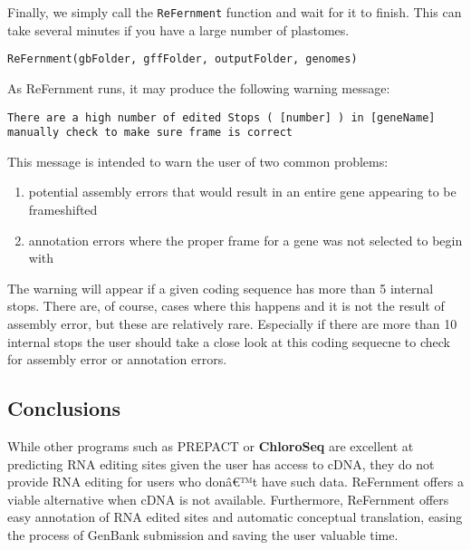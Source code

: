 \documentclass[]{article}
\providecommand{\tightlist}{%
  \setlength{\itemsep}{0pt}\setlength{\parskip}{0pt}}
\begin{document}
Finally, we simply call the \texttt{ReFernment} function and wait for it
to finish. This can take several minutes if you have a large number of
plastomes.

\begin{verbatim}
ReFernment(gbFolder, gffFolder, outputFolder, genomes)
\end{verbatim}

As ReFernment runs, it may produce the following warning message:

\begin{verbatim}
There are a high number of edited Stops ( [number] ) in [geneName] manually check to make sure frame is correct
\end{verbatim}

This message is intended to warn the user of two common problems:

\begin{enumerate}
\tightlist
\item
  potential assembly errors that would result in an entire gene
  appearing to be frameshifted
\item
  annotation errors where the proper frame for a gene was not selected
  to begin with
\end{enumerate}

The warning will appear if a given coding sequence has more than 5
internal stops. There are, of course, cases where this happens and it is
not the result of assembly error, but these are relatively rare.
Especially if there are more than 10 internal stops the user should take
a close look at this coding sequecne to check for assembly error or
annotation errors.

\hypertarget{conclusions}{%
\subsection{Conclusions}\label{conclusions}}

While other programs such as PREPACT or \textbf{ChloroSeq} are excellent
at predicting RNA editing sites given the user has access to cDNA, they
do not provide RNA editing for users who donâ€™t have such data.
ReFernment offers a viable alternative when cDNA is not available.
Furthermore, ReFernment offers easy annotation of RNA edited sites and
automatic conceptual translation, easing the process of GenBank
submission and saving the user valuable time.
\end{document}
